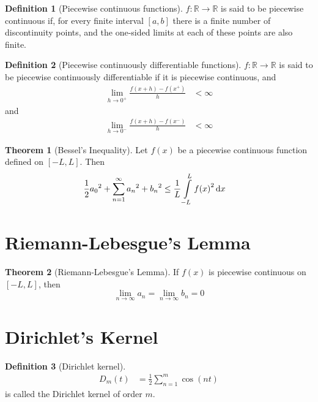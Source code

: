 \documentclass[fleqn, a4paper, 12pt, twoside]{article}
\theoremstyle{definition}
\newtheorem{definition}{Definition}
\theoremstyle{theorem}
\newtheorem{theorem}{Theorem}
\begin{document}
\begin{definition}[Piecewise continuous functions]
	$f : \mathbb{R} \to \mathbb{R}$ is said to be piecewise continuous if, for every finite interval $[a,b]$ there is a finite number of discontinuity points, and the one-sided limits at each of these points are also finite.
\end{definition}

\begin{definition}[Piecewise continuously differentiable functions]
	$f : \mathbb{R} \to \mathbb{R}$ is said to be piecewise continuously differentiable if it is piecewise continuous, and
	\begin{align*}
		\lim\limits_{h \to 0^+} \frac{f(x + h) - f(x^+)}{h} & < \infty
	\end{align*}
	and
	\begin{align*}
		\lim\limits_{h \to 0^-} \frac{f(x + h) - f(x^-)}{h} & < \infty
	\end{align*}
\end{definition}

\begin{theorem}[Bessel's Inequality]
	Let $f(x)$ be a piecewise continuous function defined on $[-L,L]$.
	Then
	\begin{align*}
		\frac{1}{2} {a_0}^2 + \sum\limits_{n = 1}^{\infty} {a_n}^2 + {b_n}^2 & \le \frac{1}{L} \int\limits_{-L}^{L} {f(x)}^2 \dif x
	\end{align*}
	\label{Bessel's_Inequality}
\end{theorem}

\section{Riemann-Lebesgue's Lemma}

\begin{theorem}[Riemann-Lebesgue's Lemma]
	If $f(x)$ is piecewise continuous on $[-L,L]$, then
	\begin{equation*}
		\lim\limits_{n \to \infty} a_n = \lim\limits_{n \to \infty} b_n = 0
	\end{equation*}
	\label{Riemann-Lebesgue's_Lemma}
\end{theorem}

\section{Dirichlet's Kernel}

\begin{definition}[Dirichlet kernel]
	\begin{align*}
		D_m(t) & = \frac{1}{2} \sum\limits_{n = 1}^{m} \cos(n t)
	\end{align*}
	is called the Dirichlet kernel of order $m$.
\end{definition}
\end{document}
